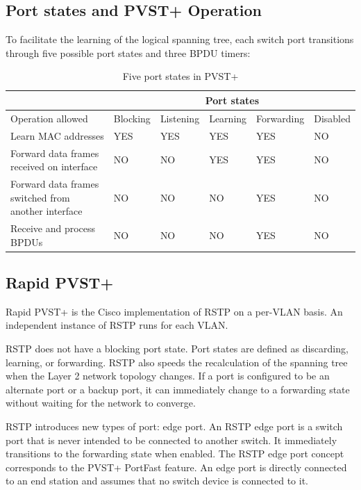 \subsection{Port states and PVST+ Operation}
To facilitate the learning of the logical spanning tree, each switch port transitions through five possible port states and three BPDU timers:
\begin{table}[h!]
\centering
\caption{Five port states in PVST+}
\label{PVST-port-state}
\begin{tabular}{|p{}|l|l|l|l|l|}
\hline
                                                    & \multicolumn{5}{c|}{Port states}                        \\ \hline
Operation allowed                                   & Blocking & Listening & Learning & Forwarding & Disabled \\ \hline
Learn MAC addresses                                 & YES      & YES       & YES      & YES        & NO       \\ \hline
Forward data frames received on interface           & NO       & NO        & YES      & YES        & NO       \\ \hline
Forward data frames switched from another interface & NO       & NO        & NO       & YES        & NO       \\ \hline
Receive and process BPDUs                           & NO       & NO        & NO       & YES        & NO       \\ \hline
\end{tabular}
\end{table}
\subsection{Rapid PVST+}
Rapid PVST+ is the Cisco implementation of RSTP on a per-VLAN basis. An independent instance of RSTP runs for each VLAN.\par 
RSTP does not have a blocking port state. Port states are defined as discarding, learning, or forwarding. RSTP also speeds the recalculation of the spanning tree when the Layer 2 network topology changes. If a port is configured to be an alternate port or a backup port, it can immediately change to a forwarding state without waiting for the network to converge.\par 
RSTP introduces new types of port: edge port. An RSTP edge port is a switch port that is never intended to be connected to another switch. It immediately transitions to the forwarding state when enabled. The RSTP edge port concept corresponds to the PVST+ PortFast feature. An edge port is directly connected to an end station and assumes that no switch device is connected to it.